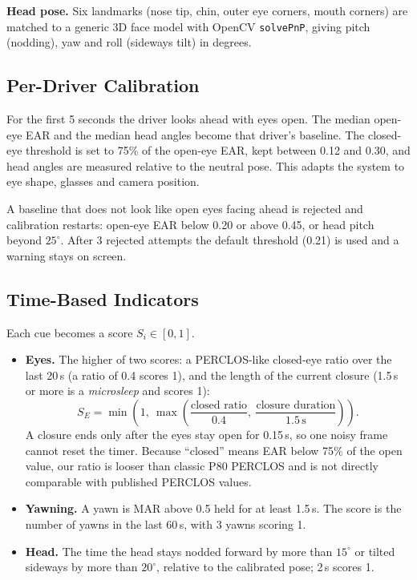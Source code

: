 \documentclass[12pt,a4paper]{article}
\newcommand{\code}[1]{\texttt{#1}}
\begin{document}
\medskip\noindent\textbf{Head pose.} Six landmarks (nose tip, chin, outer eye corners, mouth corners) are matched to a generic 3D face model with OpenCV \code{solvePnP}, giving pitch (nodding), yaw and roll (sideways tilt) in degrees.

\subsection{Per-Driver Calibration}
For the first 5 seconds the driver looks ahead with eyes open. The median open-eye EAR and the median head angles become that driver's baseline. The closed-eye threshold is set to 75\% of the open-eye EAR, kept between 0.12 and 0.30, and head angles are measured relative to the neutral pose. This adapts the system to eye shape, glasses and camera position.

A baseline that does not look like open eyes facing ahead is rejected and calibration restarts: open-eye EAR below 0.20 or above 0.45, or head pitch beyond $25^\circ$. After 3 rejected attempts the default threshold (0.21) is used and a warning stays on screen.

\subsection{Time-Based Indicators}
Each cue becomes a score $S_i \in [0,1]$.

\begin{itemize}
\item \textbf{Eyes.} The higher of two scores: a PERCLOS-like closed-eye ratio over the last 20\,s (a ratio of 0.4 scores 1), and the length of the current closure (1.5\,s or more is a \emph{microsleep} and scores 1):
\begin{equation}
S_E = \min\!\left(1,\ \max\!\left(\frac{\text{closed ratio}}{0.4},\ \frac{\text{closure duration}}{1.5\,\mathrm{s}}\right)\right).
\end{equation}
A closure ends only after the eyes stay open for 0.15\,s, so one noisy frame cannot reset the timer. Because ``closed'' means EAR below 75\% of the open value, our ratio is looser than classic P80 PERCLOS and is not directly comparable with published PERCLOS values.
\item \textbf{Yawning.} A yawn is MAR above 0.5 held for at least 1.5\,s. The score is the number of yawns in the last 60\,s, with 3 yawns scoring 1.
\item \textbf{Head.} The time the head stays nodded forward by more than $15^\circ$ or tilted sideways by more than $20^\circ$, relative to the calibrated pose; 2\,s scores 1.
\end{itemize}
\end{document}
